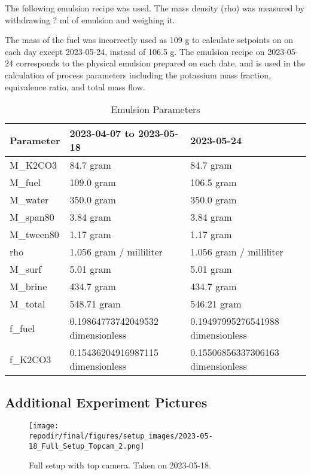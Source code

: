 The following emulsion recipe was used. The mass density (rho) was measured by withdrawing ? ml of emulsion and weighing it. 

The mass of the fuel was incorrectly used as 109 g to calculate setpoints on on each day except 2023-05-24, instead of 106.5 g. The emulsion recipe on 2023-05-24 corresponds to the physical emulsion prepared on each date, and is used in the calculation of process parameters including the potassium mass fraction, equivalence ratio, and total mass flow. 


\begin{table}[h]
\centering
\begin{tabular}{|l|l|l|}
\hline
\textbf{Parameter} & \textbf{2023-04-07 to 2023-05-18} & \textbf{2023-05-24} \\
\hline
M\_K2CO3 & 84.7 gram & 84.7 gram \\
M\_fuel & 109.0 gram & 106.5 gram \\
M\_water & 350.0 gram & 350.0 gram \\
M\_span80 & 3.84 gram & 3.84 gram \\
M\_tween80 & 1.17 gram & 1.17 gram \\
rho & 1.056 gram / milliliter & 1.056 gram / milliliter \\
M\_surf & 5.01 gram & 5.01 gram \\
M\_brine & 434.7 gram & 434.7 gram \\
M\_total & 548.71 gram & 546.21 gram \\
f\_fuel & 0.19864773742049532 dimensionless & 0.19497995276541988 dimensionless \\
f\_K2CO3 & 0.15436204916987115 dimensionless & 0.15506856337306163 dimensionless \\
\hline
\end{tabular}
\caption{Emulsion Parameters}
\label{tab:emulsion_parameters}
\end{table}

\subsection{Additional Experiment Pictures}

\begin{figure}[]
\centering
\texttt{[image: \\repodir/final/figures/setup\_images/2023-05-18\_Full\_Setup\_Topcam\_2.png]}
\caption{Full setup with top camera. Taken on 2023-05-18.}
\label{fig:SI_Full_Setup_Topcam}
\end{figure}


